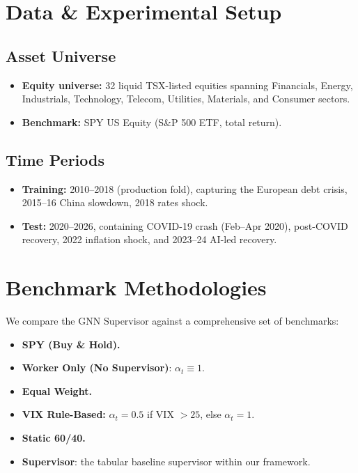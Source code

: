 \documentclass[conferences]{IEEEtran}
\begin{document}
\section{Data \& Experimental Setup}

\subsection{Asset Universe}
\begin{itemize}
    \item \textbf{Equity universe:} 32 liquid TSX-listed equities spanning Financials, Energy, Industrials, Technology, Telecom, Utilities, Materials, and Consumer sectors.
    \item \textbf{Benchmark:} SPY US Equity (S\&P 500 ETF, total return).
\end{itemize}


\subsection{Time Periods}
\begin{itemize}
    \item \textbf{Training:} 2010--2018 (production fold), capturing the European debt crisis, 2015--16 China slowdown, 2018 rates shock.
    \item \textbf{Test:} 2020--2026, containing COVID-19 crash (Feb--Apr 2020), post-COVID recovery, 2022 inflation shock, and 2023--24 AI-led recovery.
\end{itemize}


\section{Benchmark Methodologies}

We compare the GNN Supervisor against a comprehensive set of benchmarks:
\begin{itemize}
    \item \textbf{SPY (Buy \& Hold).}
    \item \textbf{Worker Only (No Supervisor)}: $\alpha_t \equiv 1$.
    \item \textbf{Equal Weight.}
    \item \textbf{VIX Rule-Based:} $\alpha_t = 0.5$ if VIX $> 25$, else $\alpha_t = 1$.
    \item \textbf{Static 60/40.}
    \item \textbf{Supervisor}: the tabular baseline supervisor within our framework.
\end{itemize}
\end{document}
